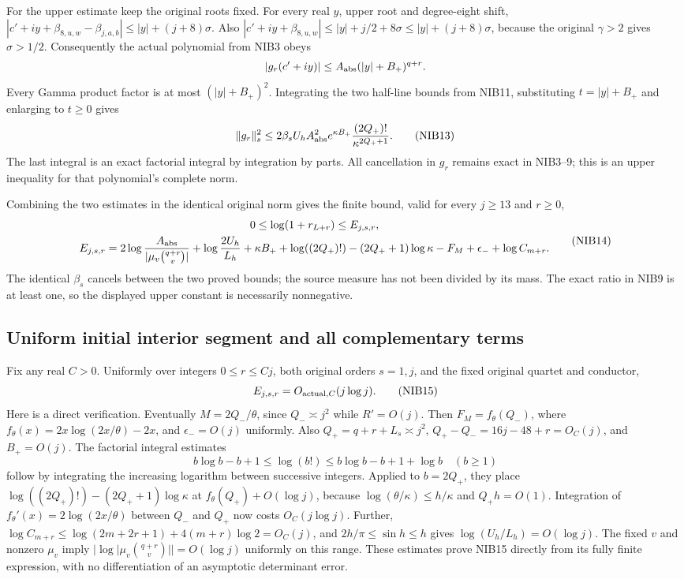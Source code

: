 \documentclass[11pt,a4paper]{article}
\begin{document}
For the upper estimate keep the original roots fixed. For every
real $y$, upper root and degree-eight shift,
$|c'+iy+\beta_{8,u,w}-\beta_{j,a,b}|\le |y|+(j+8)\sigma$.
Also
$|c'+iy+\beta_{8,u,w}|\le |y|+j/2+8\sigma
\le |y|+(j+8)\sigma$, because the original $\gamma>2$ gives
$\sigma>1/2$. Consequently the actual polynomial from NIB3 obeys
\[
 |g_r(c'+iy)|\le A_{\rm abs}(|y|+B_+)^{q+r}.
\]
Every Gamma product factor is at most $(|y|+B_+)^2$.
Integrating the two half-line bounds from NIB11, substituting
$t=|y|+B_+$ and enlarging to $t\ge0$ gives
\[
 \|g_r\|_s^2\le
   2\beta_sU_hA_{\rm abs}^2e^{\kappa B_+}
                       \frac{(2Q_+)!}{\kappa^{2Q_++1}}.    \tag{NIB13}
\]
The last integral is an exact factorial integral by integration
by parts. All cancellation in $g_r$ remains exact in NIB3--9;
this is an upper inequality for that polynomial's complete norm.

Combining the two estimates in the identical original norm gives
the finite bound, valid for every $j\ge13$ and $r\ge0$,
\[
\begin{gathered}
 0\le\log(1+r_{L+r})\le E_{j,s,r},\\
 E_{j,s,r}=
 2\log\frac{A_{\rm abs}}{|\mu_v\binom{q+r}{v}|}
 +\log\frac{2U_h}{L_h}+\kappa B_++\log((2Q_+)!)
 -(2Q_++1)\log\kappa-F_M+\epsilon_-+\log C_{m+r}.
\end{gathered}                                                     \tag{NIB14}
\]
The identical $\beta_s$ cancels between the two proved bounds;
the source measure has not been divided by its mass. The exact
ratio in NIB9 is at least one, so the displayed upper constant
is necessarily nonnegative.

\subsection{Uniform initial interior segment and all complementary terms}
Fix any real $C>0$. Uniformly over integers $0\le r\le Cj$,
both original orders $s=1,j$, and the fixed original quartet and
conductor,
\[
                  E_{j,s,r}=O_{{\rm actual},C}(j\log j).   \tag{NIB15}
\]
Here is a direct verification. Eventually $M=2Q_-/\theta$,
since $Q_-\asymp j^2$ while $R'=O(j)$. Then
$F_M=f_\theta(Q_-)$, where $f_\theta(x)=2x\log(2x/\theta)-2x$,
and $\epsilon_-=O(j)$ uniformly. Also $Q_+=q+r+L_s\asymp j^2$,
$Q_+-Q_-=16j-48+r=O_C(j)$, and $B_+=O(j)$.
The factorial integral estimates
\[
 b\log b-b+1\le\log(b!)\le b\log b-b+1+\log b
 \quad(b\ge1)
\]
follow by integrating the increasing logarithm between successive
integers. Applied to $b=2Q_+$, they place
$\log((2Q_+)!) -(2Q_++1)\log\kappa$ at
$f_\theta(Q_+)+O(\log j)$, because
$\log(\theta/\kappa)\le h/\kappa$ and $Q_+h=O(1)$.
Integration of $f_\theta'(x)=2\log(2x/\theta)$ between $Q_-$
and $Q_+$ now costs $O_C(j\log j)$.
Further, $\log C_{m+r}\le\log(2m+2r+1)+4(m+r)\log2=O_C(j)$,
and $2h/\pi\le\sin h\le h$ gives
$\log(U_h/L_h)=O(\log j)$. The fixed $v$ and nonzero
$\mu_v$ imply $|\log|\mu_v\binom{q+r}{v}||=O(\log j)$
uniformly on this range. These estimates prove NIB15 directly
from its fully finite expression, with no differentiation of
an asymptotic determinant error.
\end{document}
